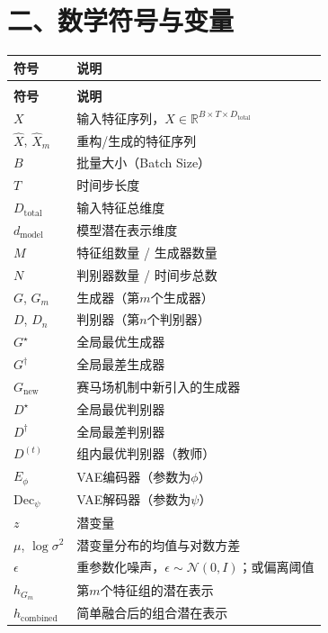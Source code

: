 \section*{二、数学符号与变量}

\begin{longtable}{>{\raggedright\arraybackslash}p{4cm} p{10cm}}
\toprule
\textbf{符号} & \textbf{说明} \\
\midrule
\endfirsthead
\multicolumn{2}{c}{\tablename\ -- 续表} \\
\toprule
\textbf{符号} & \textbf{说明} \\
\midrule
\endhead
\bottomrule
\endlastfoot

$X$ & 输入特征序列，$X \in \mathbb{R}^{B \times T \times D_{\text{total}}}$ \\
$\hat{X}$, $\hat{X}_m$ & 重构/生成的特征序列 \\
$B$ & 批量大小（Batch Size） \\
$T$ & 时间步长度 \\
$D_{\text{total}}$ & 输入特征总维度 \\
$d_{\text{model}}$ & 模型潜在表示维度 \\
$M$ & 特征组数量 / 生成器数量 \\
$N$ & 判别器数量 / 时间步总数 \\
$G$, $G_m$ & 生成器（第$m$个生成器） \\
$D$, $D_n$ & 判别器（第$n$个判别器） \\
$G^{\star}$ & 全局最优生成器 \\
$G^{\dagger}$ & 全局最差生成器 \\
$G_{\text{new}}$ & 赛马场机制中新引入的生成器 \\
$D^{\star}$ & 全局最优判别器 \\
$D^{\dagger}$ & 全局最差判别器 \\
$D^{(t)}$ & 组内最优判别器（教师） \\
$E_{\phi}$ & VAE编码器（参数为$\phi$） \\
$\text{Dec}_{\psi}$ & VAE解码器（参数为$\psi$） \\
$z$ & 潜变量 \\
$\mu$, $\log \sigma^2$ & 潜变量分布的均值与对数方差 \\
$\epsilon$ & 重参数化噪声，$\epsilon \sim \mathcal{N}(0,I)$；或偏离阈值 \\
$h_{G_m}$ & 第$m$个特征组的潜在表示 \\
$h_{\text{combined}}$ & 简单融合后的组合潜在表示 \\

\end{longtable}
